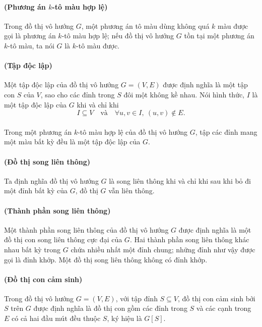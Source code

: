 \documentclass[11pt]{article}
\begin{document}
\paragraph{ (Phương án \(k\)-tô màu hợp lệ)}
Trong đồ thị vô hướng \(G\), một phương án tô màu dùng không quá \(k\) màu
được gọi là phương án \(k\)-tô màu hợp lệ; nếu đồ thị vô hướng \(G\) tồn tại
một phương án \(k\)-tô màu, ta nói \(G\) là \(k\)-tô màu được.

\paragraph{ (Tập độc lập)}
Một tập độc lập của đồ thị vô hướng \(G=(V,E)\) được định nghĩa là một tập con
\(S\) của \(V\), sao cho các đỉnh trong \(S\) đôi một không kề nhau. Nói hình
thức, \(I\) là một tập độc lập của \(G\) khi và chỉ khi
\[
  I\subseteq V\quad\text{và}\quad
  \forall u,v\in I,\ (u,v)\notin E.
\]

\paragraph{}
Trong một phương án \(k\)-tô màu hợp lệ của đồ thị vô hướng \(G\), tập các
đỉnh mang một màu bất kỳ đều là một tập độc lập của \(G\).

\paragraph{ (Đồ thị song liên thông)}
Ta định nghĩa đồ thị vô hướng \(G\) là song liên thông khi và chỉ khi sau khi
bỏ đi một đỉnh bất kỳ của \(G\), đồ thị \(G\) vẫn liên thông.

\paragraph{ (Thành phần song liên thông)}
Một thành phần song liên thông của đồ thị vô hướng \(G\) được định nghĩa là
một đồ thị con song liên thông cực đại của \(G\). Hai thành phần song liên
thông khác nhau bất kỳ trong \(G\) chứa nhiều nhất một đỉnh chung; những đỉnh
như vậy được gọi là đỉnh khớp. Một đồ thị song liên thông không có đỉnh khớp.

\paragraph{ (Đồ thị con cảm sinh)}
Trong đồ thị vô hướng \(G=(V,E)\), với tập đỉnh \(S\subseteq V\), đồ thị con
cảm sinh bởi \(S\) trên \(G\) được định nghĩa là đồ thị con gồm các đỉnh trong
\(S\) và các cạnh trong \(E\) có cả hai đầu mút đều thuộc \(S\), ký hiệu là
\(G[S]\).
\end{document}

